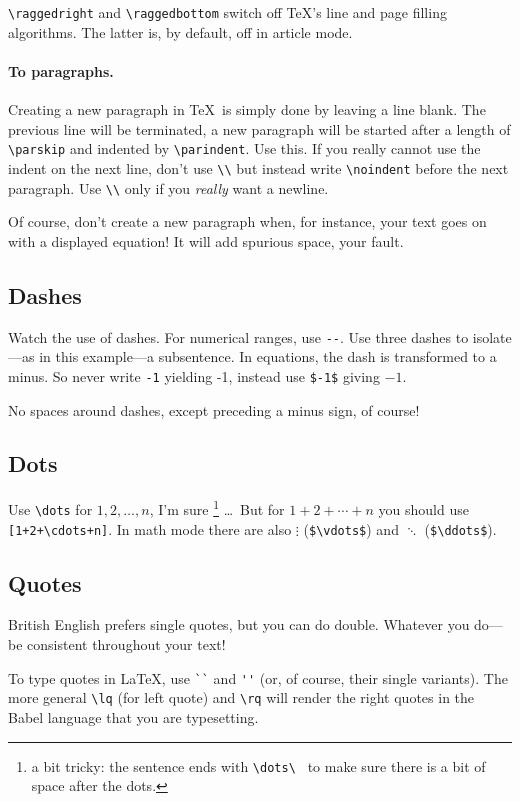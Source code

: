 \documentclass{article}
\begin{document}
\verb+\raggedright+ and \verb+\raggedbottom+ switch off \TeX's line and page filling algorithms.
The latter is, by default, off in article mode.


\paragraph{To paragraphs.}
Creating a new paragraph in \TeX\ is simply done by leaving a line blank.
The previous line will be terminated, a new paragraph will be started after a 
length of \verb+\parskip+ and indented by \verb+\parindent+.  Use this.  If you really
cannot use the indent on the next line, don't use \verb+\\+ but instead write 
\verb+\noindent+ before the next paragraph.  Use \verb+\\+ only if you
\textsl{really} want a newline.

Of course, don't create a new paragraph when, for instance, your text goes on with
a displayed equation!  It will add spurious space, your fault.


\subsection{Dashes}
Watch the use of dashes.  For numerical ranges, use \verb+--+.  Use three 
dashes to isolate---as in this example---a
subsentence.  In equations, the dash is transformed to a minus. 
So never write \verb+-1+ yielding -1, instead use \verb+$-1$+ giving $-1$.

No spaces around dashes, except preceding a minus sign, of course!

\subsection{Dots}
Use \verb+\dots+ for $1,2,\dots,n$, I'm sure%
\footnote{a bit tricky: the sentence ends with \protect\verb+\dots\ + to make sure
there is a bit of space after the dots.}%
\dots\ But for $1+2+\cdots+n$ you should use \verb-[1+2+\cdots+n]-. In math mode there are
also $\vdots$ (\verb+$\vdots$+) and $\ddots$ (\verb+$\ddots$+).

\subsection{Quotes}
British English prefers single quotes, but you can do double.  Whatever you
do---be consistent throughout your text!

To type quotes in \LaTeX, use \verb+``+ and \verb+''+ (or, of course, their single variants).  The more
general \verb+\lq+ (for left quote) and \verb+\rq+ will render the right quotes in the Babel
language that you are typesetting.
\end{document}
